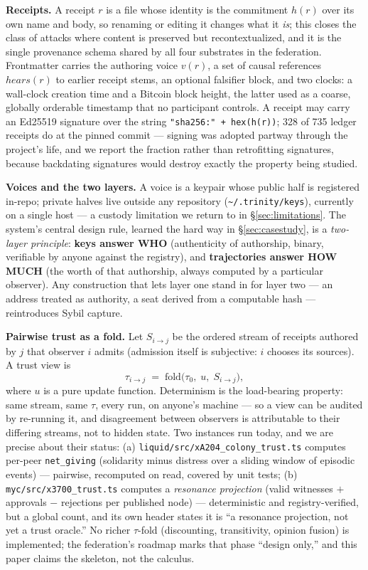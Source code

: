 \documentclass[10pt]{article}
\newcommand{\code}[1]{\texttt{\small #1}}
\newcommand{\repopath}[1]{\texttt{\small #1}}
\begin{document}
\textbf{Receipts.} A receipt $r$ is a file whose identity is the commitment
$h(r)$ over its own name and body, so renaming or editing it changes what it
\emph{is}; this closes the class of attacks where content is preserved but
recontextualized, and it is the single provenance schema shared by all four
substrates in the federation. Frontmatter carries the authoring voice
$v(r)$, a set of causal references $\mathit{hears}(r)$ to earlier receipt
stems, an optional falsifier block, and two clocks: a wall-clock creation
time and a Bitcoin block height, the latter used as a coarse, globally
orderable timestamp that no participant controls. A receipt may carry an
Ed25519 signature over the string \code{"sha256:" + hex(h(r))}; 328 of 735
ledger receipts do at the pinned commit --- signing was adopted partway
through the project's life, and we report the fraction rather than
retrofitting signatures, because backdating signatures would destroy
exactly the property being studied.

\textbf{Voices and the two layers.} A voice is a keypair whose public half
is registered in-repo; private halves live outside any repository
(\repopath{\textasciitilde/.trinity/keys}), currently on a single host ---
a custody limitation we return to in \S\ref{sec:limitations}. The system's
central design rule, learned the hard way in \S\ref{sec:casestudy}, is a
\emph{two-layer principle}: \textbf{keys answer WHO} (authenticity of
authorship, binary, verifiable by anyone against the registry), and
\textbf{trajectories answer HOW MUCH} (the worth of that authorship, always
computed by a particular observer). Any construction that lets layer one
stand in for layer two --- an address treated as authority, a seat derived
from a computable hash --- reintroduces Sybil capture.

\textbf{Pairwise trust as a fold.} Let $S_{i \to j}$ be the ordered stream
of receipts authored by $j$ that observer $i$ admits (admission itself is
subjective: $i$ chooses its sources). A trust view is
\[
\tau_{i \to j} \;=\; \mathrm{fold}\bigl(\tau_0,\; u,\; S_{i \to j}\bigr),
\]
where $u$ is a pure update function. Determinism is the load-bearing
property: same stream, same $\tau$, every run, on anyone's machine --- so a
view can be audited by re-running it, and disagreement between observers is
attributable to their differing streams, not to hidden state. Two instances
run today, and we are precise about their status: (a)
\repopath{liquid/src/xA204\_colony\_trust.ts} computes per-peer
\code{net\_giving} (solidarity minus distress over a sliding window of
episodic events) --- pairwise, recomputed on read, covered by unit tests;
(b) \repopath{myc/src/x3700\_trust.ts} computes a \emph{resonance
projection} (valid witnesses $+$ approvals $-$ rejections per published
node) --- deterministic and registry-verified, but a global count, and its
own header states it is ``a resonance projection, not yet a trust oracle.''
No richer $\tau$-fold (discounting, transitivity, opinion fusion) is
implemented; the federation's roadmap marks that phase ``design only,'' and
this paper claims the skeleton, not the calculus.
\end{document}
